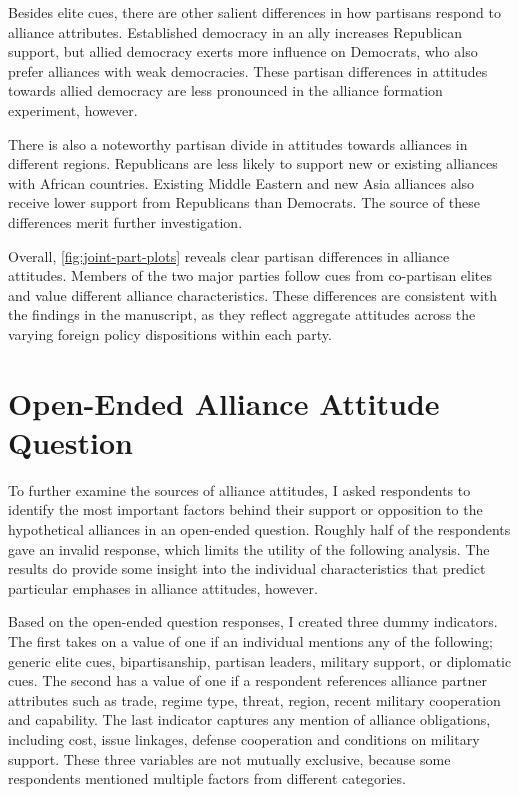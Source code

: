 \documentclass[12pt]{article}
\begin{document}
Besides elite cues, there are other salient differences in how partisans respond to alliance attributes.
Established democracy in an ally increases Republican support, but allied democracy exerts more influence on Democrats, who also prefer alliances with weak democracies. 
These partisan differences in attitudes towards allied democracy are less pronounced in the alliance formation experiment, however. 


There is also a noteworthy partisan divide in attitudes towards alliances in different regions.
Republicans are less likely to support new or existing alliances with African countries. 
Existing Middle Eastern and new Asia alliances also receive lower support from Republicans than Democrats.
The source of these differences merit further investigation. 


Overall, \autoref{fig:joint-part-plots} reveals clear partisan differences in alliance attitudes. 
Members of the two major parties follow cues from co-partisan elites and value different alliance characteristics. 
These differences are consistent with the findings in the manuscript, as they reflect aggregate attitudes across the varying foreign policy dispositions within each party. 



\section{Open-Ended Alliance Attitude Question} 


To further examine the sources of alliance attitudes, I asked respondents to identify the most important factors behind their support or opposition to the hypothetical alliances in an open-ended question. 
Roughly half of the respondents gave an invalid response, which limits the utility of the following analysis. 
The results do provide some insight into the individual characteristics that predict particular emphases in alliance attitudes, however. 


Based on the open-ended question responses, I created three dummy indicators. 
The first takes on a value of one if an individual mentions any of the following; generic elite cues, bipartisanship, partisan leaders, military support, or diplomatic cues. 
The second has a value of one if a respondent references alliance partner attributes such as trade, regime type, threat, region, recent military cooperation and capability. 
The last indicator captures any mention of alliance obligations, including cost, issue linkages, defense cooperation and conditions on military support. 
These three variables are not mutually exclusive, because some respondents mentioned multiple factors from different categories. 
\end{document}
